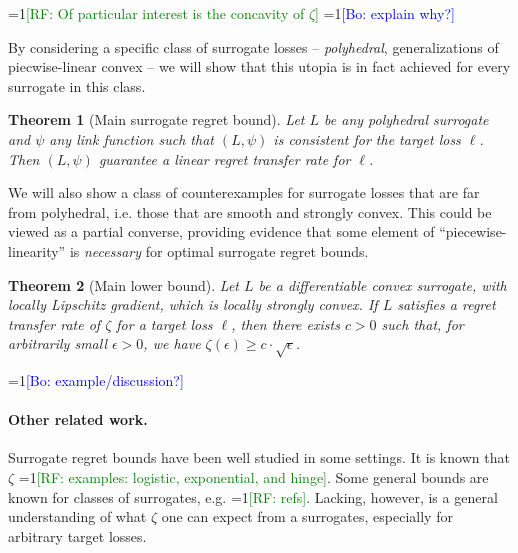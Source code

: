 \documentclass{article}
\newtheorem{theorem}{Theorem}
\newcommand{\Comments}{1}
\newcommand{\mynote}[2]{\ifnum\Comments=1\textcolor{#1}{#2}\fi}
\newcommand{\raf}[1]{\mynote{green}{[RF: #1]}}
\newcommand{\bo}[1]{\mynote{blue}{[Bo: #1]}}
\begin{document}
\raf{Of particular interest is the concavity of $\zeta$} \bo{explain why?}

By considering a specific class of surrogate losses -- \emph{polyhedral}, generalizations of piecwise-linear convex -- we will show that this utopia is in fact achieved for every surrogate in this class.

\begin{theorem}[Main surrogate regret bound]
  \label{thm:main-upper}
  Let $L$ be any polyhedral surrogate and $\psi$ any link function such that $(L,\psi)$ is consistent for the target loss $\ell$.
  Then $(L,\psi)$ guarantee a linear regret transfer rate for $\ell$.
\end{theorem}

We will also show a class of counterexamples for surrogate losses that are far from polyhedral, i.e. those that are smooth and strongly convex.
This could be viewed as a partial converse, providing evidence that some element of ``piecewise-linearity'' is \emph{necessary} for optimal surrogate regret bounds.
\begin{theorem}[Main lower bound]
  \label{thm:main-lower}
  Let $L$ be a differentiable convex surrogate, with locally Lipschitz gradient, which is locally strongly convex.
  If $L$ satisfies a regret transfer rate of $\zeta$ for a target loss $\ell$, then there exists $c>0$ such that, for arbitrarily small $\epsilon>0$, we have $\zeta(\epsilon) \geq c\cdot\sqrt{\epsilon}$.
\end{theorem}

\bo{example/discussion?}

\paragraph{Other related work.}
Surrogate regret bounds have been well studied in some settings.
It is known that $\zeta$ \raf{examples: logistic, exponential, and hinge}.
Some general bounds are known for classes of surrogates, e.g. \raf{refs}.
Lacking, however, is a general understanding of what $\zeta$ one can expect from a surrogates, especially for arbitrary target losses.
\end{document}
